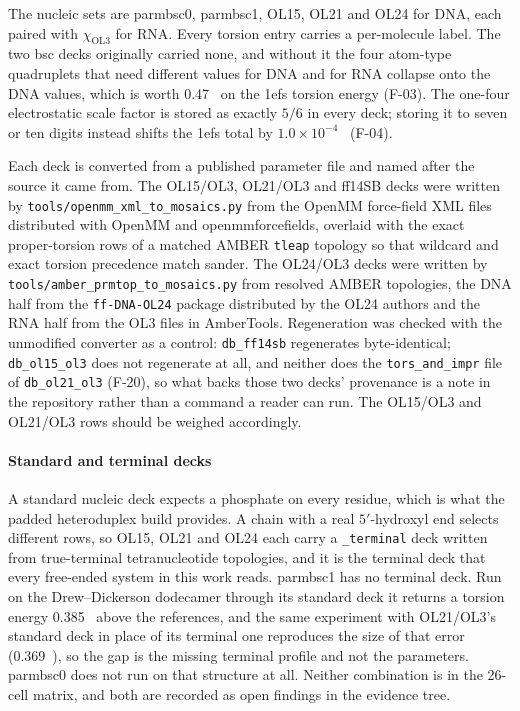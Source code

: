 The nucleic sets are parmbsc0\cite{perez2007bsc0}, parmbsc1\cite{ivani2016bsc1},
OL15\cite{zgarbova2015ol15}, OL21\cite{zgarbova2021ol21} and
OL24\cite{zgarbova2025ol24} for DNA, each paired with
$\chi_{\mathrm{OL3}}$\cite{zgarbova2011ol3} for RNA. Every torsion entry
carries a per-molecule label. The two bsc decks originally carried none, and
without it the four atom-type quadruplets that need different values for DNA
and for RNA collapse onto the DNA values, which is worth 0.47~\kcal{} on the
1efs torsion energy (F-03). The one-four electrostatic scale factor is stored
as exactly $5/6$ in every deck; storing it to seven or ten digits instead
shifts the 1efs total by $1.0\times10^{-4}$~\kcal{} (F-04).

Each deck is converted from a published parameter file and named after the
source it came from. The OL15/OL3, OL21/OL3 and ff14SB decks were written by
\texttt{tools/openmm\_xml\_to\_mosaics.py} from the OpenMM force-field XML
files distributed with OpenMM and openmmforcefields, overlaid with the exact
proper-torsion rows of a matched AMBER \texttt{tleap} topology so that wildcard
and exact torsion precedence match sander. The OL24/OL3 decks were written by
\texttt{tools/amber\_prmtop\_to\_mosaics.py} from resolved AMBER topologies,
the DNA half from the \texttt{ff-DNA-OL24} package distributed by the OL24
authors and the RNA half from the OL3 files in AmberTools. Regeneration was
checked with the unmodified converter as a control: \texttt{db\_ff14sb}
regenerates byte-identical; \texttt{db\_ol15\_ol3} does not regenerate at all,
and neither does the \texttt{tors\_and\_impr} file of \texttt{db\_ol21\_ol3}
(F-20), so what backs those two decks' provenance is a note in the repository
rather than a command a reader can run. The OL15/OL3 and OL21/OL3 rows should
be weighed accordingly.

\paragraph{Standard and terminal decks}
A standard nucleic deck expects a phosphate on every residue, which is what the
padded heteroduplex build provides. A chain with a real $5'$-hydroxyl end
selects different rows, so OL15, OL21 and OL24 each carry a
\texttt{\_terminal} deck written from true-terminal tetranucleotide topologies,
and it is the terminal deck that every free-ended system in this work reads.
parmbsc1 has no terminal deck. Run on the Drew--Dickerson dodecamer through its
standard deck it returns a torsion energy 0.385~\kcal{} above the references,
and the same experiment with OL21/OL3's standard deck in place of its terminal
one reproduces the size of that error (0.369~\kcal{}), so the gap is the missing
terminal profile and not the parameters. parmbsc0 does not run on that
structure at all. Neither combination is in the 26-cell matrix, and both are
recorded as open findings in the evidence tree.

